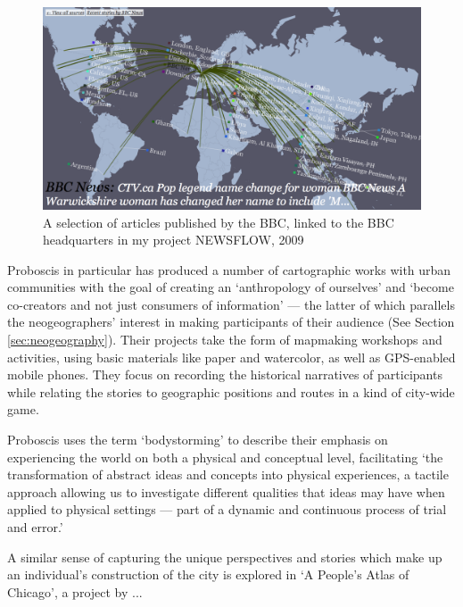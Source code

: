 \documentclass[11pt,oneside,notitlepage]{report}
\begin{document}
\begin{figure}[h]
	\begin{center}
		\includegraphics[width=1\textwidth]{images/newsflow.png}
		\caption{A selection of articles published by the BBC, linked to the BBC headquarters in my project NEWSFLOW, 2009}
	\end{center}
\end{figure}

Proboscis in particular has produced a number of cartographic works with urban communities with the goal of creating an `anthropology of ourselves' and `become co-creators and not just consumers of information' --- the latter of which parallels the neogeographers' interest in making participants of their audience (See Section \ref{sec:neogeography}). Their projects take the form of mapmaking workshops and activities, using basic materials like paper and watercolor, as well as GPS-enabled mobile phones. They focus on recording the historical narratives of participants while relating the stories to geographic positions and routes in a kind of city-wide game. 

Proboscis uses the term `bodystorming' to describe their emphasis on experiencing the world on both a physical and conceptual level, facilitating `the transformation of abstract ideas and concepts into physical experiences, a tactile approach allowing us to investigate different qualities that ideas may have when applied to physical settings --- part of a dynamic and continuous process of trial and error.' \cite{proboscis2003bodystorming} 


A similar sense of capturing the unique perspectives and stories which make up an individual's construction of the city is explored in `A People's Atlas of Chicago', a project by ...
\end{document}
